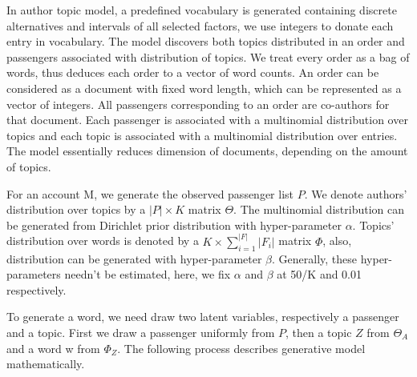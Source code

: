 \documentclass{sig-alternate-05-2015}
\begin{document}
In author topic model\cite{deiv:corpora}, a predefined vocabulary is generated containing discrete alternatives and intervals of all selected factors, we use integers to donate each entry in vocabulary. The model discovers both topics distributed in an order and passengers associated with distribution of topics. We treat every order as a bag of words, thus deduces each order to a vector of word counts. An order can be considered as a document with fixed word length, which can be represented as a vector of integers. All passengers corresponding to an order are co-authors for that document. Each passenger is associated with a multinomial distribution over topics and each topic is associated with a multinomial distribution over entries. The model essentially reduces dimension of documents, depending on the amount of topics.\par
For an account M, we generate the observed passenger list $P$. We denote authors' distribution over topics by a $|P| \times K$ matrix $\Theta$. The multinomial distribution can be generated from Dirichlet prior distribution with hyper-parameter $\alpha$. Topics' distribution over words is denoted by a $K \times \sum_{i=1}^{|F|}|F_i| $  matrix $\Phi$, also, distribution can be generated with hyper-parameter $\beta$. Generally, these hyper-parameters needn't be estimated, here, we fix $\alpha$ and $\beta$ at 50/K and 0.01 respectively. \par
To generate a word, we need draw two latent variables, respectively a passenger and a topic. First we draw a passenger uniformly from $P$, then a topic $Z$ from $\Theta_A$ and a word w from $\Phi_Z$. The following process describes generative model mathematically.\par
\end{document}
